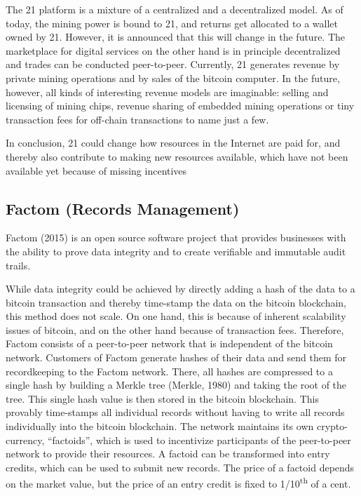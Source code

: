 The 21 platform is a mixture of a centralized and a decentralized model. As of 
today, the mining power is bound to 21, and returns get allocated to a wallet owned 
by 21. However, it is announced that this will change in the future. The marketplace 
for digital services on the other hand is in principle decentralized and trades 
can be conducted peer-to-peer. Currently, 21 generates revenue by private mining 
operations and by sales of the bitcoin computer. In the future, however, all kinds 
of interesting revenue models are imaginable: selling and licensing of mining chips, 
revenue sharing of embedded mining operations or tiny transaction fees for off-chain 
transactions to name just a few. 

In conclusion, 21 could change how resources in the Internet are paid for, and 
thereby also contribute to making new resources available, which have not been 
available yet because of missing incentives

\subsection{Factom (Records Management)}
\label{sec:ecofactom}

Factom (2015) is an open source software project that provides businesses with 
the ability to prove data integrity and to create verifiable and immutable audit 
trails. 

While data integrity could be achieved by directly adding a hash of the data to 
a bitcoin transaction and thereby time-stamp the data on the bitcoin blockchain, 
this method does not scale. On one hand, this is because of inherent scalability 
issues of bitcoin, and on the other hand because of transaction fees. Therefore, 
Factom consists of a peer-to-peer network that is independent of the bitcoin network. 
Customers of Factom generate hashes of their data and send them for recordkeeping 
to the Factom network. There, all hashes are compressed to a single hash by building 
a Merkle tree (Merkle, 1980) and taking the root of the tree. This single hash 
value is then stored in the bitcoin blockchain. This provably time-stamps all individual 
records without having to write all records individually into the bitcoin blockchain. 
The network maintains its own crypto-currency, ``factoids'', which is used to incentivize 
participants of the peer-to-peer network to provide their resources. A factoid 
can be transformed into entry credits, which can be used to submit new records. 
The price of a factoid depends on the market value, but the price of an entry credit 
is fixed to 1/10\textsuperscript{th} of a cent. 

